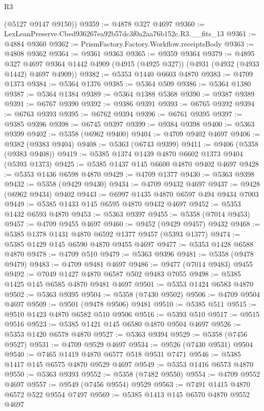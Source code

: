 \begin{lexlean}{R3}
\begin{coremodule}
      (@5127 @9147 @9150))
@9359 := @4878 @327 @4697
@9360 := LexLeanPreserve.Cbed936267ea92b57dc3f0a2aa76b152c.R3.__fits_13
@9361 := @4884 @9360
@9362 := PrismFactory.Factory.Workflow.receiptsBody
@9363 := @4808 @9362
@9364 := @9361 @9363
@9365 := @9359 @9364
@9379 := @4895
    @327
    @4697
    @9364
    @1442
    @4909
    (@4915 (@4925 @327))
    (@4931 (@4932 (@4933 @1442) @4697 @4909))
@9382 := @5353 @1440 @6603 @4870
@9383 := @4709 @1373
@9384 := @5364 @1376
@9385 := @5364 @509
@9386 := @5364 @1380
@9387 := @5364 @1384
@9389 := @5364 @1388 @5368
@9390 := @9387 @9389
@9391 := @6767 @9390
@9392 := @9386 @9391
@9393 := @6765 @9392
@9394 := @6763 @9393
@9395 := @6762 @9394
@9396 := @6761 @9395
@9397 := @9385 @9396
@9398 := @6745 @9397
@9399 := @9384 @9398
@9400 := @5363 @9399
@9402 := @5358 (@6962 @9400)
@9404 := @4709 @9402 @4697
@9406 := @9382 (@9383 @9404)
@9408 := @5363 (@6743 @9399)
@9411 := @9406 (@5358 (@9383 @9408))
@9419 := @5385 @1374 @1439 @4870 @6602 @1373 @9404 (@5393 @1373)
@9425 := @5385 @1437 @145 @6600 @4870 @9402 @4697
@9428 := @5353 @1436 @6598 @4870
@9429 := @4709 @1377
@9430 := @5363 @9398
@9432 := @5358 (@9429 @9430)
@9434 := @4709 @9432 @4697
@9437 := @9428 (@6962 @9434) @9402
@9443 := @6997 @1435 @4870 @6597 @494 @9434 @7003
@9449 := @5385 @1433 @145 @6595 @4870 @9432 @4697
@9452 := @5353 @1432 @6593 @4870
@9453 := @5363 @9397
@9455 := @5358 (@7014 @9453)
@9457 := @4709 @9455 @4697
@9460 := @9452 (@9429 @9457) @9432
@9468 := @5385 @1378 @1431 @4870 @6592 @1377 @9457 (@5393 @1377)
@9474 := @5385 @1429 @145 @6590 @4870 @9455 @4697
@9477 := @5353 @1428 @6588 @4870
@9478 := @4709 @510
@9479 := @5363 @9396
@9481 := @5358 (@9478 @9479)
@9483 := @4709 @9481 @4697
@9486 := @9477 (@7014 @9483) @9455
@9492 := @7049 @1427 @4870 @6587 @502 @9483 @7055
@9498 := @5385 @1425 @145 @6585 @4870 @9481 @4697
@9501 := @5353 @1424 @6583 @4870
@9502 := @5363 @9395
@9504 := @5358 (@7430 @9502)
@9506 := @4709 @9504 @4697
@9509 := @9501 (@9478 @9506) @9481
@9510 := @5385 @511
@9515 := @9510 @1423 @4870 @6582 @510 @9506
@9516 := @5393 @510
@9517 := @9515 @9516
@9523 := @5385 @1421 @145 @6580 @4870 @9504 @4697
@9526 := @5353 @1420 @6578 @4870
@9527 := @5363 @9394
@9529 := @5358 (@7456 @9527)
@9531 := @4709 @9529 @4697
@9534 := @9526 (@7430 @9531) @9504
@9540 := @7465 @1419 @4870 @6577 @518 @9531 @7471
@9546 := @5385 @1417 @145 @6575 @4870 @9529 @4697
@9549 := @5353 @1416 @6573 @4870
@9550 := @5363 @9393
@9552 := @5358 (@7482 @9550)
@9554 := @4709 @9552 @4697
@9557 := @9549 (@7456 @9554) @9529
@9563 := @7491 @1415 @4870 @6572 @522 @9554 @7497
@9569 := @5385 @1413 @145 @6570 @4870 @9552 @4697

\end{coremodule}
\end{lexlean}
